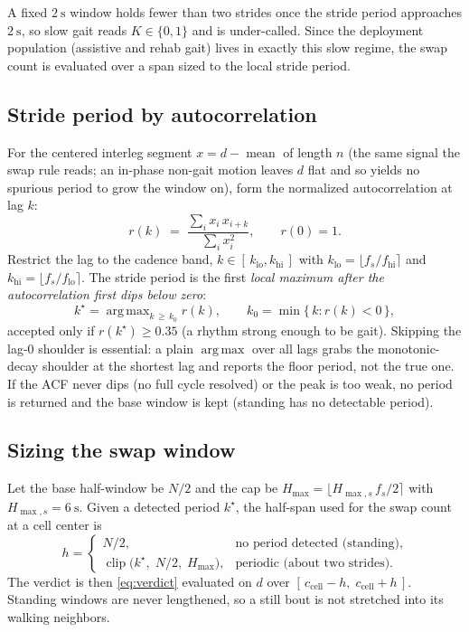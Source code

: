 \documentclass[11pt]{article}
\newcommand{\ileg}{d}                   %
\DeclareMathOperator*{\argmax}{arg\,max}
\begin{document}
A fixed $2~\text{s}$ window holds fewer than two strides once the stride period
approaches $2~\text{s}$, so slow gait reads $K \in \{0,1\}$ and is under-called. Since
the deployment population (assistive and rehab gait) lives in exactly this slow regime,
the swap count is evaluated over a span sized to the local stride period.

\subsection{Stride period by autocorrelation}

For the centered interleg segment $x = \ileg - \operatorname{mean}$ of length $n$ (the
same signal the swap rule reads; an in-phase non-gait motion leaves $\ileg$ flat and so
yields no spurious period to grow the window on), form the normalized autocorrelation at
lag $k$:
\begin{equation}
r(k) \;=\; \frac{\displaystyle\sum_{i} x_i\, x_{i+k}}{\displaystyle\sum_{i} x_i^2},
\qquad r(0) = 1.
\end{equation}
Restrict the lag to the cadence band,
$k \in [\,k_\text{lo}, k_\text{hi}\,]$ with
$k_\text{lo} = \lfloor f_s / f_\text{hi} \rceil$ and
$k_\text{hi} = \lfloor f_s / f_\text{lo} \rceil$. The stride period is the first
\emph{local maximum after the autocorrelation first dips below zero}:
\begin{equation}
k^{\star} = \argmax_{k \,\geq\, k_0} r(k),
\qquad
k_0 = \min\{\,k : r(k) < 0\,\},
\end{equation}
accepted only if $r(k^{\star}) \geq 0.35$ (a rhythm strong enough to be gait). Skipping
the lag-0 shoulder is essential: a plain $\argmax$ over all lags grabs the
monotonic-decay shoulder at the shortest lag and reports the floor period, not the true
one. If the ACF never dips (no full cycle resolved) or the peak is too weak, no period
is returned and the base window is kept (standing has no detectable period).

\subsection{Sizing the swap window}

Let the base half-window be $N/2$ and the cap be
$H_\text{max} = \lfloor H_{\max,s}\, f_s / 2 \rceil$ with $H_{\max,s} = 6~\text{s}$. Given a
detected period $k^{\star}$, the half-span used for the swap count at a cell center is
\begin{equation}
h =
\begin{cases}
N/2, & \text{no period detected (standing),}\\[2pt]
\operatorname{clip}\big(k^{\star},\; N/2,\; H_\text{max}\big), & \text{periodic (about two strides).}
\end{cases}
\end{equation}
The verdict is then \eqref{eq:verdict} evaluated on $\ileg$ over
$[\,c_\text{cell}-h,\; c_\text{cell}+h\,]$. Standing windows are never lengthened, so a
still bout is not stretched into its walking neighbors.
\end{document}

